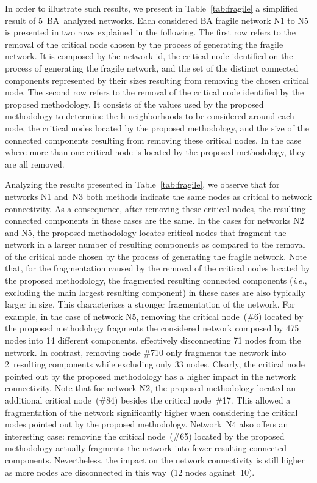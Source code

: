 \documentclass[conference,fleqn]{IEEEtran}
\begin{document}
In order to illustrate such results, we present 
in Table~\ref{tab:fragile} a simplified result of 5~BA~analyzed networks. Each considered BA fragile network N1 to N5 is presented in two rows explained
in the following. The first row 
refers to the removal of the critical node chosen by the process of generating the fragile network. It is composed by the network id,
the critical node identified on the process of generating the fragile network, and 
the set of the distinct connected components represented by their sizes resulting from removing the chosen critical node.
The second row refers to the removal of the critical node identified by the proposed methodology. It consists of the  values used by the 
proposed methodology to determine the h-neighborhoods to be considered around each node, the critical nodes located by the proposed methodology,
and the size of the connected components resulting from removing these critical nodes. In the case where more than one critical
node is located by the proposed methodology, they are all removed.

Analyzing the results presented in Table~\ref{tab:fragile}, we observe that for networks N1 and~N3 both methods 
indicate the same nodes as critical to network connectivity. As a consequence, after removing these critical nodes,
the resulting connected components in these cases are the same. In the cases for networks N2 and N5, the proposed
methodology locates critical nodes that fragment the network in a larger number of resulting components as compared
to the removal of the critical node chosen by the process of generating the fragile network. Note that, for the fragmentation
caused by the removal of the critical nodes located by the proposed methodology, the fragmented
resulting connected components (\textit{i.e.}, excluding the main largest resulting component) in these cases are
also typically larger in size. This characterizes a stronger fragmentation of the network. For example, in the case
of network N5, removing the critical node~(\#6) located by the proposed methodology fragments the considered network 
composed by 475 nodes into 14 different components, effectively disconnecting 71 nodes from the network. In contrast,
removing node \#710 only fragments the network into 2~resulting components while excluding only 33 nodes.
Clearly, the critical node pointed out by the proposed methodology has a higher impact in the network connectivity.
Note that for network N2, the proposed methodology located an additional critical node~(\#84) besides the critical node~\#17.
This allowed a fragmentation of the network significantly higher when considering the critical nodes pointed out
by the proposed methodology.
Network~N4 also offers an interesting case: removing the critical node~(\#65) located by the proposed methodology actually
fragments the network into fewer resulting connected components. Nevertheless, the impact on the 
network connectivity is still higher as more nodes are disconnected in this way~(12 nodes against~10).
\end{document}

